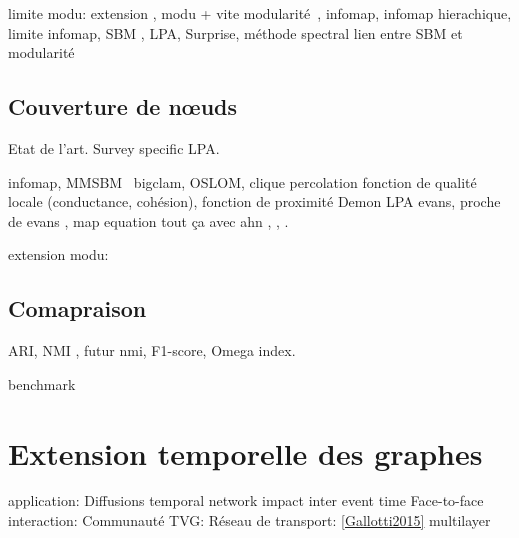 limite modu: \cite{Fortunato2007,Good2010,Lancichinetti2011} extension \cite{Reichardt2006,Delvenne2010}, modu + vite \cite{Huang2015,Blondel2008a,Traag2015a}
modularité~\cite{Newman2004}, infomap\cite{Rosvall2008}, infomap hierachique\cite{Rosvall2011a}, limite infomap\cite{Kawamoto2015}, SBM \cite{Holland1983a}, LPA\cite{Raghavan2007a}, Surprise, méthode spectral
lien entre SBM et modularité\cite{Newman2016}


\subsection{Couverture de n\oe uds}
\label{subsec:cover}
Etat de l'art.
\cite{Danisch2012, Kanawati2014, Xie2013,Bandyopadhyay2015, Hric2014a}
Survey specific LPA\cite{Kanawati2014}.

infomap\cite{Esquivel2011},  MMSBM~\cite{Ball2011,Airoldi2008,Gopalan2013a} \cite{Yang2013} bigclam, OSLOM\cite{Lancichinetti2011a}, clique percolation\cite{Palla2005} fonction de qualité locale (conductance, cohésion), fonction de proximité
Demon \cite{Coscia2012c} LPA
\cite{Evans2009} evans, proche de evans \cite{Wang}, map equation\cite{Kim2011} tout ça avec ahn \cite{Ahn2010a} \cite{He2014}, \cite{Huang2013} \cite{Kim2014a} \cite{Lim2014} \cite{Shi2013}, \cite{Yu2013}.

extension modu: \cite{Shen2009,Nicosia2009}

\subsection{Comapraison}
ARI, NMI \cite{Danon2005}, futur nmi\cite{Zhang2015}, F1-score, Omega index. \cite{Porumbel2011}



benchmark \cite{Lancichinetti2008,Lancichinetti2009b}

\section{Extension temporelle des graphes}
\label{sec:intro_extension_temporelle}

\cite{Hartmann2014}

application:
Diffusions \cite{Backlund2014, Gauvin2015} \cite{Karimi2013,Holme2014a,Horvath2014,Karsai2011,Kivela2012,Lambiotte2013,Lee2012,Perotti2014,Rocha2011,Scholtes2014,Scholtes2013}temporal network \cite{Jo2014} impact inter event time
Face-to-face interaction: \cite{Barrat2013,Asur2009}
Communauté TVG: \cite{Bassett2013,Bazzi2016}
Réseau de transport: \ref{Gallotti2015} multilayer
